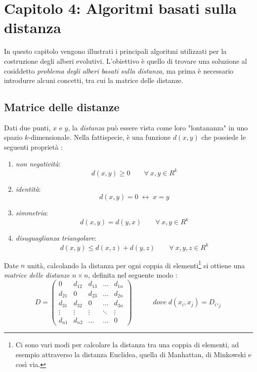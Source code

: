 \chapter{Capitolo 4: Algoritmi basati sulla distanza}
In questo capitolo vengono illustrati i principali algoritmi utilizzati per la costruzione degli alberi evolutivi. L'obiettivo è quello di trovare una soluzione al cosiddetto \textit{problema degli alberi basati sulla distanza}, ma prima è necessario introdurre alcuni concetti, tra cui la matrice delle distanze.

\section{Matrice delle distanze}
Dati due punti, $x$ e $y$, la \textit{distanza} può essere vista come loro "lontananza" in uno spazio $k$-dimensionale. Nella fattispecie, è una funzione $d(x,y)$ che possiede le seguenti proprietà \cite{molaCagliari}:
\begin{enumerate}
	\item \textit{non negatività}:
	\[d(x,y)\geq 0\hspace{2em} \forall \: x,y\in R^k\]
	\item \textit{identità}:
	\[d(x,y)=0 \; \leftrightarrow \; x=y\]
	\item \textit{simmetria}:
	\[d(x,y)=d(y,x)\hspace{2em} \forall \: x,y\in R^k\]
	\item \textit{disuguaglianza triangolare}:
	\[d(x,y)\leq d(x,z)+d(y,z)\hspace{2em} \forall \: x,y,z\in R^k\]
\end{enumerate}
Date $n$ unità, calcolando la distanza per ogni coppia di elementi\footnote{Ci sono vari modi per calcolare la distanza tra una coppia di elementi, ad esempio attraverso la distanza Euclidea, quella di Manhattan, di Minkowski e così via.} si ottiene una \textit{matrice delle distanze $n \times n$}, definita nel seguente modo \cite{ingrassiaStatistica}:
\[
D = \begin{pmatrix}
0 & d_{12} & d_{13} & \ldots & d_{1n} \\ 
d_{21} & 0 & d_{23} & \ldots & d_{2n} \\ 
d_{31} & d_{32} & 0 & \ldots & d_{3n} \\ 
\vdots & \vdots & \vdots & \ddots & \vdots \\ 
d_{n1} & d_{n2} & \ldots & \ldots & 0
\end{pmatrix}
\hspace{3em}dove\;d(x_i,x_j)=D_i,_j
\]
